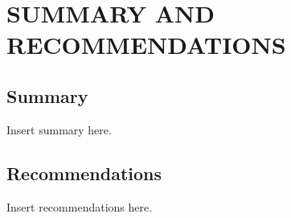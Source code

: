 \chapter{SUMMARY AND RECOMMENDATIONS}

\section{Summary}

Insert summary here.

\section{Recommendations}

Insert recommendations here.